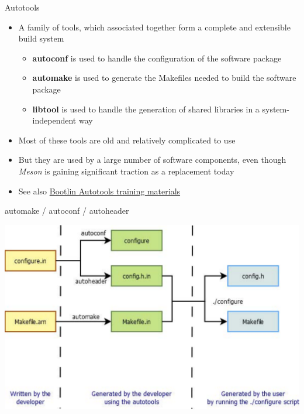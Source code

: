 \begin{frame}{Autotools}
  \begin{itemize}
  \item A family of tools, which associated together form a complete
    and extensible build system
    \begin{itemize}
    \item {\bf autoconf} is used to handle the configuration of the
      software package
    \item {\bf automake} is used to generate the Makefiles needed to
      build the software package
    \item {\bf libtool} is used to handle the generation of shared
      libraries in a system-independent way
    \end{itemize}
  \item Most of these tools are old and relatively complicated to use
  \item But they are used by a large number of software components,
    even though {\em Meson} is gaining significant traction as a
    replacement today
  \item See also
    \href{https://bootlin.com/doc/training/autotools/}{Bootlin
      Autotools training materials}
  \end{itemize}
\end{frame}

\begin{frame}{automake / autoconf / autoheader}
  \begin{center}
    \includegraphics[height=0.8\textheight]{slides/sysdev-cross-compiling-user-space/autotools.pdf}
  \end{center}
\end{frame}


